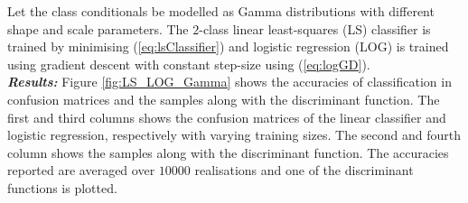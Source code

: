 \documentclass[12pt, a4 paper]{article}
\begin{document}
Let the class conditionals be modelled as Gamma distributions with different shape and scale parameters. The $2$-class linear least-squares (LS) classifier is trained by minimising (\ref{eq:lsClassifier}) and logistic regression (LOG) is trained using gradient descent with constant step-size using (\ref{eq:logGD}). \\

{\it \bfseries Results:} Figure \ref{fig:LS_LOG_Gamma} shows the accuracies of classification in confusion matrices and the samples along with the discriminant function. The first and third columns shows the confusion matrices of the linear classifier and logistic regression, respectively with varying training sizes. The second and fourth column shows the samples along with the discriminant function. The accuracies reported are averaged over $10000$ realisations and one of the discriminant functions is plotted. \\
\end{document}
